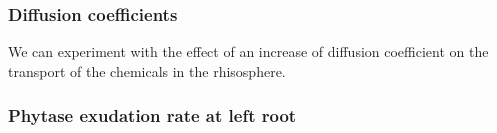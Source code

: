 \documentclass[11pt]{article}
\numberwithin{equation}{section}
\begin{document}
\subsubsection{Diffusion coefficients}
We can experiment with the effect of an increase of diffusion coefficient on the transport of the chemicals in the rhisosphere. 





\subsubsection{Phytase exudation rate at left root}
\label{sec:numexp_F11}
\end{document}
